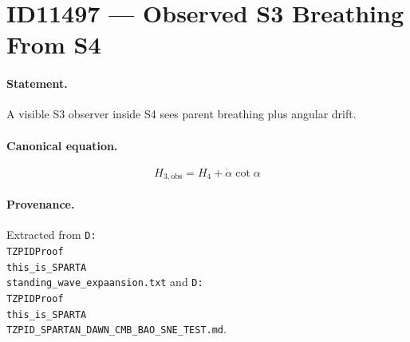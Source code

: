 \section*{ID11497 --- Observed S3 Breathing From S4}

\paragraph{Statement.}
A visible S3 observer inside S4 sees parent breathing plus angular drift.

\paragraph{Canonical equation.}
\[
H_{3,\mathrm{obs}}=H_4+\dot\alpha\cot\alpha
\]

\paragraph{Provenance.}
Extracted from \texttt{D:\\TZPIDProof\\this\_is\_SPARTA\\standing\_wave\_expaansion.txt} and \texttt{D:\\TZPIDProof\\this\_is\_SPARTA\\TZPID\_SPARTAN\_DAWN\_CMB\_BAO\_SNE\_TEST.md}.
